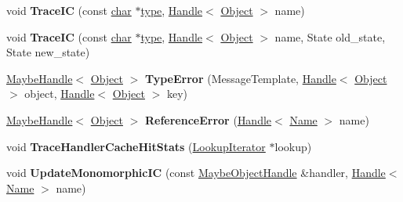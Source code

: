 \begin{DoxyCompactItemize}
void {\bfseries Trace\+IC} (const \mbox{\hyperlink{classchar}{char}} $\ast$\mbox{\hyperlink{classstd_1_1conditional_1_1type}{type}}, \mbox{\hyperlink{classv8_1_1internal_1_1Handle}{Handle}}$<$ \mbox{\hyperlink{classv8_1_1internal_1_1Object}{Object}} $>$ name)
\item 
\mbox{\label{classv8_1_1internal_1_1IC_a8576e14981ac1ce2ae476299799eb694}} 
void {\bfseries Trace\+IC} (const \mbox{\hyperlink{classchar}{char}} $\ast$\mbox{\hyperlink{classstd_1_1conditional_1_1type}{type}}, \mbox{\hyperlink{classv8_1_1internal_1_1Handle}{Handle}}$<$ \mbox{\hyperlink{classv8_1_1internal_1_1Object}{Object}} $>$ name, State old\+\_\+state, State new\+\_\+state)
\item 
\mbox{\label{classv8_1_1internal_1_1IC_ade2240792cd90e92ee9e5557513e6623}} 
\mbox{\hyperlink{classv8_1_1internal_1_1MaybeHandle}{Maybe\+Handle}}$<$ \mbox{\hyperlink{classv8_1_1internal_1_1Object}{Object}} $>$ {\bfseries Type\+Error} (Message\+Template, \mbox{\hyperlink{classv8_1_1internal_1_1Handle}{Handle}}$<$ \mbox{\hyperlink{classv8_1_1internal_1_1Object}{Object}} $>$ object, \mbox{\hyperlink{classv8_1_1internal_1_1Handle}{Handle}}$<$ \mbox{\hyperlink{classv8_1_1internal_1_1Object}{Object}} $>$ key)
\item 
\mbox{\label{classv8_1_1internal_1_1IC_ae78e3ad7c18effdc35a4b307d497ad6d}} 
\mbox{\hyperlink{classv8_1_1internal_1_1MaybeHandle}{Maybe\+Handle}}$<$ \mbox{\hyperlink{classv8_1_1internal_1_1Object}{Object}} $>$ {\bfseries Reference\+Error} (\mbox{\hyperlink{classv8_1_1internal_1_1Handle}{Handle}}$<$ \mbox{\hyperlink{classv8_1_1internal_1_1Name}{Name}} $>$ name)
\item 
\mbox{\label{classv8_1_1internal_1_1IC_a1de2d809d3d50997e8a8e964123e19d3}} 
void {\bfseries Trace\+Handler\+Cache\+Hit\+Stats} (\mbox{\hyperlink{classv8_1_1internal_1_1LookupIterator}{Lookup\+Iterator}} $\ast$lookup)
\item 
\mbox{\label{classv8_1_1internal_1_1IC_accd84fe4cd421486aa3315b4518e22d3}} 
void {\bfseries Update\+Monomorphic\+IC} (const \mbox{\hyperlink{classv8_1_1internal_1_1MaybeObjectHandle}{Maybe\+Object\+Handle}} \&handler, \mbox{\hyperlink{classv8_1_1internal_1_1Handle}{Handle}}$<$ \mbox{\hyperlink{classv8_1_1internal_1_1Name}{Name}} $>$ name)

\end{DoxyCompactItemize}
